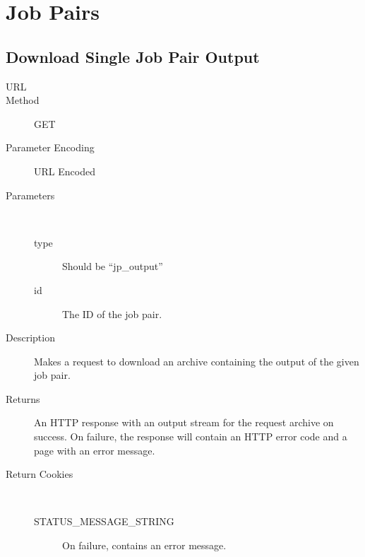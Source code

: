 \chapter{Job Pairs}


\section{Download Single Job Pair Output}
\begin{description}
\item [URL] 
\item [Method] GET
\item [Parameter Encoding] URL Encoded
\item [Parameters] \
	\begin{description}
	\item [type]  Should be “jp\_output”
	\item [id]  The ID of the job pair.
	\end{description}
\item [Description] Makes a request to download an archive containing the output of the given job pair.
\item [Returns] An HTTP response with an output stream for the request archive on success. On failure, the response will contain an HTTP error code and a page with an error message.
\item [Return Cookies] \
	\begin{description}
	\item [STATUS\_MESSAGE\_STRING]  On failure, contains an error message.
	\end{description}
\end{description}


